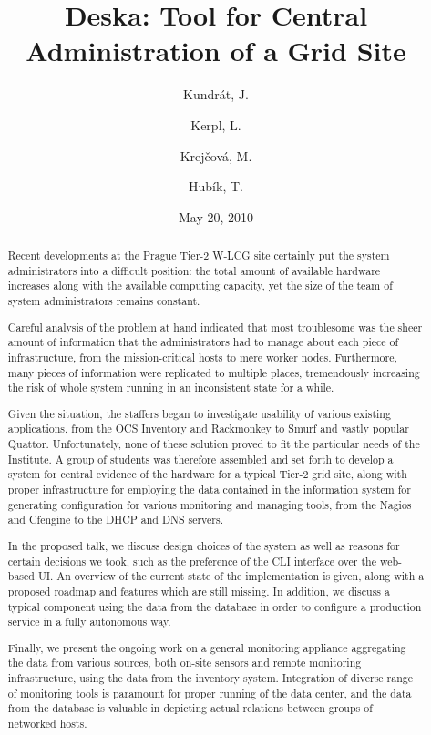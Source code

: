 \documentclass[11pt]{article}
\title{\sc Deska: Tool for Central Administration of a Grid Site}
\author[1,2,*]{Kundrát, J.}
\affil[1]{Institute of Physics of the AS CR, Prague, Czech Republic}
\author[2]{Kerpl, L.}
\author[2]{Krejčová, M.}
\author[2]{Hubík, T.}
\affil[2]{Faculty of Mathematics and Physics, Charles University in Prague, Czech Republic}
\date{May 20, 2010}
\begin{document}
\let\oldthefootnote\thefootnote
\renewcommand{\thefootnote}{\fnsymbol{footnote}}
\let\thefootnote\oldthefootnote

\maketitle
 
\begin{abstract}
Recent developments at the Prague Tier-2 W-LCG site certainly put the system
administrators into a difficult position: the total amount of available hardware
increases along with the available computing capacity, yet the size of the team
of system administrators remains constant.

Careful analysis of the problem at hand indicated that most troublesome was the
sheer amount of information that the administrators had to manage about each
piece of infrastructure, from the mission-critical hosts to mere worker nodes.
Furthermore, many pieces of information were replicated to multiple places,
tremendously increasing the risk of whole system running in an inconsistent
state for a while.

Given the situation, the staffers began to investigate usability of various
existing applications, from the OCS Inventory and Rackmonkey to Smurf and vastly
popular Quattor.  Unfortunately, none of these solution proved to fit the
particular needs of the Institute.  A group of students was therefore assembled
and set forth to develop a system for central evidence of the hardware for a
typical Tier-2 grid site, along with proper infrastructure for employing the
data contained in the information system for generating configuration for
various monitoring and managing tools, from the Nagios and Cfengine to the DHCP
and DNS servers.

In the proposed talk, we discuss design choices of the system as well as reasons
for certain decisions we took, such as the preference of the CLI interface over
the web-based UI.  An overview of the current state of the implementation is
given, along with a proposed roadmap and features which are still missing.  In
addition, we discuss a typical component using the data from the database in
order to configure a production service in a fully autonomous way.

Finally, we present the ongoing work on a general monitoring appliance
aggregating the data from various sources, both on-site sensors and remote
monitoring infrastructure, using the data from the inventory system.
Integration of diverse range of monitoring tools is paramount for proper running
of the data center, and the data from the database is valuable in depicting
actual relations between groups of networked hosts.

\end{abstract}
\end{document}

